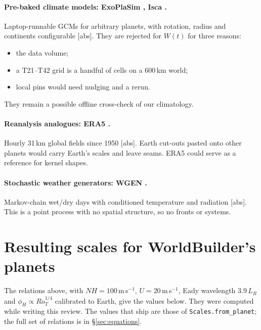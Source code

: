 \documentclass[11pt,a4paper]{article}
\newcommand{\verif}[1]{\textsf{\small[#1]}}
\begin{document}
\paragraph{Pre-baked climate models: ExoPlaSim \cite{paradise2022}, Isca \cite{vallis2018}.}
Laptop-runnable GCMs for arbitrary planets, with rotation, radius and continents
configurable \verif{abs}. They are rejected for $W(t)$ for three reasons:
\begin{itemize}
\item the data volume;
\item a T21--T42 grid is a handful of cells on a 600\,km world;
\item local pins would need nudging and a rerun.
\end{itemize}
They remain a possible offline cross-check of our climatology.

\paragraph{Reanalysis analogues: ERA5 \cite{hersbach2020}.}
Hourly 31\,km global fields since 1950 \verif{abs}. Earth cut-outs pasted onto other planets
would carry Earth's scales and leave seams. ERA5 could serve as a reference for kernel shapes.

\paragraph{Stochastic weather generators: WGEN \cite{richardson1981}.}
Markov-chain wet/dry days with conditioned temperature and radiation \verif{abs}. This is a
point process with no spatial structure, so no fronts or systems.

\section{Resulting scales for WorldBuilder's planets}
The relations above, with $NH=100$\,m\,s$^{-1}$, $U=20$\,m\,s$^{-1}$, Eady wavelength
$3.9\,L_R$ and $\phi_H\propto Ro_T^{1/4}$ calibrated to Earth, give the values below. They
were computed while writing this review. The values that ship are those of
\texttt{Scales.from\_planet}; the full set of relations is in \S\ref{sec:equations}.
\end{document}

